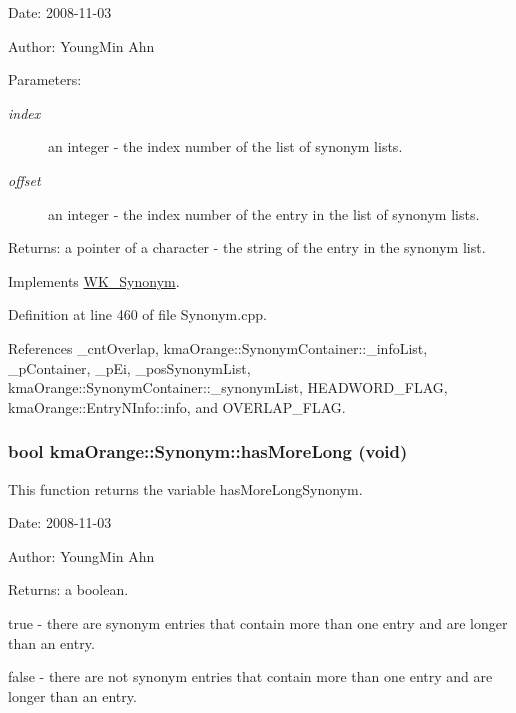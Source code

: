 \begin{Desc}
\item[Date:]2008-11-03 \end{Desc}
\begin{Desc}
\item[Author:]YoungMin Ahn \end{Desc}
\begin{Desc}
\item[Parameters:]
\begin{description}
\item[{\em index}]an integer - the index number of the list of synonym lists. \item[{\em offset}]an integer - the index number of the entry in the list of synonym lists. \end{description}
\end{Desc}
\begin{Desc}
\item[Returns:]a pointer of a character - the string of the entry in the synonym list. \end{Desc}


Implements \hyperlink{classWK__Synonym_f4d75e1d6a074196c04d8857802d9414}{WK\_\-Synonym}.

Definition at line 460 of file Synonym.cpp.

References \_\-cntOverlap, kmaOrange::SynonymContainer::\_\-infoList, \_\-pContainer, \_\-pEi, \_\-posSynonymList, kmaOrange::SynonymContainer::\_\-synonymList, HEADWORD\_\-FLAG, kmaOrange::EntryNInfo::info, and OVERLAP\_\-FLAG.\hypertarget{classkmaOrange_1_1Synonym_af600c78524ff2f1bfef1b10219f91e0}{
\subsubsection[{hasMoreLong}]{\setlength{\rightskip}{0pt plus 5cm}bool kmaOrange::Synonym::hasMoreLong (void)}}
\label{classkmaOrange_1_1Synonym_af600c78524ff2f1bfef1b10219f91e0}


This function returns the variable hasMoreLongSynonym. 

\begin{Desc}
\item[Date:]2008-11-03 \end{Desc}
\begin{Desc}
\item[Author:]YoungMin Ahn \end{Desc}
\begin{Desc}
\item[Returns:]a boolean.\par
 true - there are synonym entries that contain more than one entry and are longer than an entry.\par
 false - there are not synonym entries that contain more than one entry and are longer than an entry. \end{Desc}


